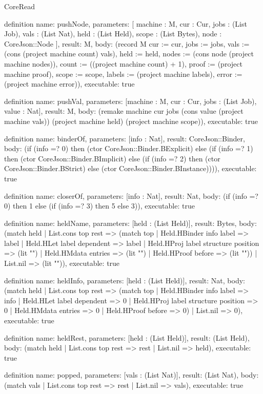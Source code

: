 \begin{lexlean}{CoreRead}
\begin{semanticmodule}
definition{
  name: pushNode,
  parameters: [
    machine : M,
    cur : Cur,
    jobs : (List Job),
    vals : (List Nat),
    held : (List Held),
    scope : (List Bytes),
    node : CoreJson::Node
  ],
  result: M,
  body: (record M {cur := cur, jobs := jobs, vals := (cons (project machine count) vals), held := held, nodes := (cons node (project machine nodes)), count := ((project machine count) + 1), proof := (project machine proof), scope := scope, labels := (project machine labels), error := (project machine error)}),
  executable: true
}

definition{
  name: pushVal,
  parameters: [machine : M, cur : Cur, jobs : (List Job), value : Nat],
  result: M,
  body: (remake machine cur jobs (cons value (project machine vals)) (project machine held) (project machine scope)),
  executable: true
}

definition{
  name: binderOf,
  parameters: [info : Nat],
  result: CoreJson::Binder,
  body: (if (info =? 0) then (ctor CoreJson::Binder.BExplicit) else (if (info =? 1) then (ctor CoreJson::Binder.BImplicit) else (if (info =? 2) then (ctor CoreJson::Binder.BStrict) else (ctor CoreJson::Binder.BInstance)))),
  executable: true
}

definition{
  name: closerOf,
  parameters: [info : Nat],
  result: Nat,
  body: (if (info =? 0) then 1 else (if (info =? 3) then 5 else 3)),
  executable: true
}

definition{
  name: heldName,
  parameters: [held : (List Held)],
  result: Bytes,
  body: (match held
    | List.cons top rest => (match top
      | Held.HBinder info label => label
      | Held.HLet label dependent => label
      | Held.HProj label structure position => (lit "")
      | Held.HMdata entries => (lit "")
      | Held.HProof before => (lit ""))
    | List.nil => (lit "")),
  executable: true
}

definition{
  name: heldInfo,
  parameters: [held : (List Held)],
  result: Nat,
  body: (match held
    | List.cons top rest => (match top
      | Held.HBinder info label => info
      | Held.HLet label dependent => 0
      | Held.HProj label structure position => 0
      | Held.HMdata entries => 0
      | Held.HProof before => 0)
    | List.nil => 0),
  executable: true
}

definition{
  name: heldRest,
  parameters: [held : (List Held)],
  result: (List Held),
  body: (match held | List.cons top rest => rest | List.nil => held),
  executable: true
}

definition{
  name: popped,
  parameters: [vals : (List Nat)],
  result: (List Nat),
  body: (match vals | List.cons top rest => rest | List.nil => vals),
  executable: true
}


\end{semanticmodule}
\end{lexlean}
